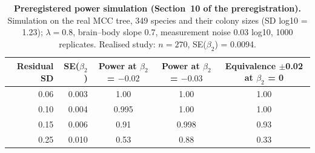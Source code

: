 \begin{table}[htbp]
\centering
\caption[Preregistered power simulation]{\textbf{Preregistered power simulation (Section~10 of the preregistration).} Simulation on the real MCC tree, 349 species and their colony sizes (SD log10 = 1.23); $\lambda = 0.8$, brain--body slope 0.7, measurement noise 0.03 log10, 1000 replicates. Realised study: $n = 270$, SE($\beta_2$) = 0.0094.}
\label{tab:S10}
\footnotesize
\begin{tabular}{@{}rrccc@{}}
\toprule
Residual SD & SE($\beta_2$) & Power at $\beta_2$ = $-0.02$ & Power at $\beta_2$ = $-0.03$ & Equivalence $\pm$0.02 at $\beta_2$ = 0 \\
\midrule
0.06 & 0.003 & 1.00 & 1.00 & 1.00 \\
0.10 & 0.004 & 0.995 & 1.00 & 1.00 \\
0.15 & 0.006 & 0.91 & 0.998 & 0.93 \\
0.25 & 0.010 & 0.53 & 0.88 & 0.33 \\
\bottomrule
\end{tabular}
\end{table}
